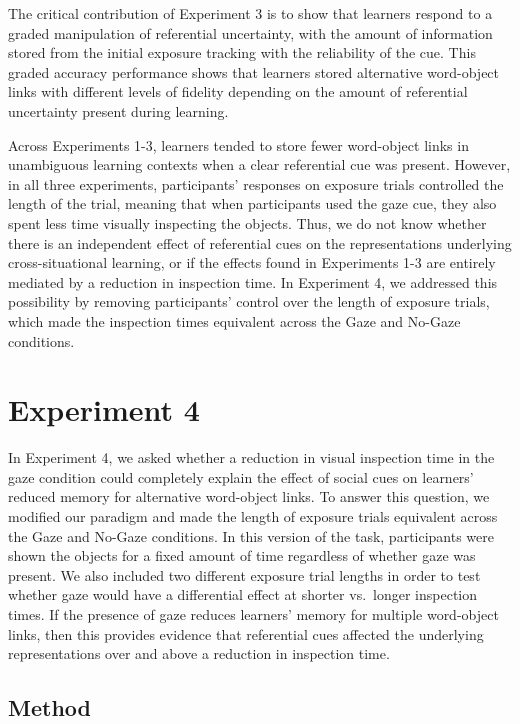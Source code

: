 \documentclass[oneside]{report}
\begin{document}
The critical contribution of Experiment 3 is to show that learners
respond to a graded manipulation of referential uncertainty, with the
amount of information stored from the initial exposure tracking with the
reliability of the cue. This graded accuracy performance shows that
learners stored alternative word-object links with different levels of
fidelity depending on the amount of referential uncertainty present
during learning.

Across Experiments 1-3, learners tended to store fewer word-object links
in unambiguous learning contexts when a clear referential cue was
present. However, in all three experiments, participants' responses on
exposure trials controlled the length of the trial, meaning that when
participants used the gaze cue, they also spent less time visually
inspecting the objects. Thus, we do not know whether there is an
independent effect of referential cues on the representations underlying
cross-situational learning, or if the effects found in Experiments 1-3
are entirely mediated by a reduction in inspection time. In Experiment
4, we addressed this possibility by removing participants' control over
the length of exposure trials, which made the inspection times
equivalent across the Gaze and No-Gaze conditions.

\hypertarget{experiment-4}{%
\section{Experiment 4}\label{experiment-4}}

In Experiment 4, we asked whether a reduction in visual inspection time
in the gaze condition could completely explain the effect of social cues
on learners' reduced memory for alternative word-object links. To answer
this question, we modified our paradigm and made the length of exposure
trials equivalent across the Gaze and No-Gaze conditions. In this
version of the task, participants were shown the objects for a fixed
amount of time regardless of whether gaze was present. We also included
two different exposure trial lengths in order to test whether gaze would
have a differential effect at shorter vs.~longer inspection times. If
the presence of gaze reduces learners' memory for multiple word-object
links, then this provides evidence that referential cues affected the
underlying representations over and above a reduction in inspection
time.

\hypertarget{method-3}{%
\subsection{Method}\label{method-3}}
\end{document}
